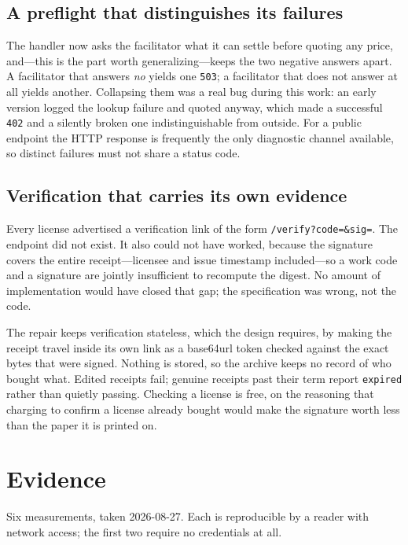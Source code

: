 \documentclass[10pt,letterpaper,twocolumn]{article}
\newcommand{\code}[1]{\texttt{#1}}
\begin{document}
\subsection{A preflight that distinguishes its failures}

The handler now asks the facilitator what it can settle before quoting any
price, and---this is the part worth generalizing---keeps the two negative
answers apart. A facilitator that answers \emph{no} yields one \code{503}; a
facilitator that does not answer at all yields another. Collapsing them was a
real bug during this work: an early version logged the lookup failure and
quoted anyway, which made a successful \code{402} and a silently broken one
indistinguishable from outside. For a public endpoint the HTTP response is
frequently the only diagnostic channel available, so distinct failures must
not share a status code.

\subsection{Verification that carries its own evidence}

Every license advertised a verification link of the form
\code{/verify?code=\&sig=}. The endpoint did not exist. It also could not have
worked, because the signature covers the entire receipt---licensee and
issue timestamp included---so a work code and a signature are jointly
insufficient to recompute the digest. No amount of implementation would have
closed that gap; the specification was wrong, not the code.

The repair keeps verification stateless, which the design requires, by making
the receipt travel inside its own link as a base64url token checked against
the exact bytes that were signed. Nothing is stored, so the archive keeps no
record of who bought what. Edited receipts fail; genuine receipts past their
term report \code{expired} rather than quietly passing. Checking a license is
free, on the reasoning that charging to confirm a license already bought would
make the signature worth less than the paper it is printed on.

\section{Evidence}
\label{sec:evidence}

Six measurements, taken 2026-08-27. Each is reproducible by a reader with
network access; the first two require no credentials at all.
\end{document}
